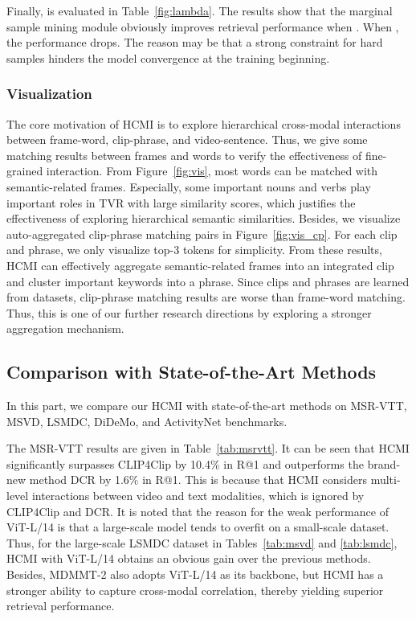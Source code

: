 \documentclass{article}
\begin{document}
Finally,  is evaluated in Table~\ref{fig:lambda}.
The results show that the marginal sample mining module obviously improves retrieval performance when .
When , the performance drops.
The reason may be that a strong constraint for hard samples hinders the model convergence at the training beginning.


\subsubsection{Visualization}
The core motivation of HCMI is to explore hierarchical cross-modal interactions between frame-word, clip-phrase, and video-sentence. 
Thus, we give some matching results between frames and words to verify the effectiveness of fine-grained interaction. 
From Figure~\ref{fig:vis}, most words can be matched with semantic-related frames.
Especially, some important nouns and verbs play important roles in TVR with large similarity scores, which justifies the effectiveness of exploring hierarchical semantic similarities.
Besides, we visualize auto-aggregated clip-phrase matching pairs in Figure~\ref{fig:vis_cp}.
For each clip and phrase, we only visualize top-3 tokens for simplicity.
From these results, HCMI can effectively aggregate semantic-related frames into an integrated clip and cluster important keywords into a phrase.
Since clips and phrases are learned from datasets, clip-phrase matching results are worse than frame-word matching.
Thus, this is one of our further research directions by exploring a stronger aggregation mechanism.

\subsection{Comparison with State-of-the-Art Methods}
In this part, we compare our HCMI with state-of-the-art methods on MSR-VTT, MSVD, LSMDC, DiDeMo, and ActivityNet benchmarks.

The MSR-VTT results are given in Table~\ref{tab:msrvtt}.
It can be seen that HCMI significantly surpasses CLIP4Clip by 10.4\% in R@1 and outperforms the brand-new method DCR by 1.6\% in R@1.
This is because that HCMI considers multi-level interactions between video and text modalities, which is ignored by CLIP4Clip and DCR.
It is noted that the reason for the weak performance of ViT-L/14 is that a large-scale model tends to overfit on a small-scale dataset.
Thus, for the large-scale LSMDC dataset in Tables~\ref{tab:msvd} and \ref{tab:lsmdc}, HCMI with ViT-L/14 obtains an obvious gain over the previous methods.
Besides, MDMMT-2 also adopts ViT-L/14 as its backbone, but HCMI has a stronger ability to capture cross-modal correlation, thereby yielding superior retrieval performance.
\end{document}
